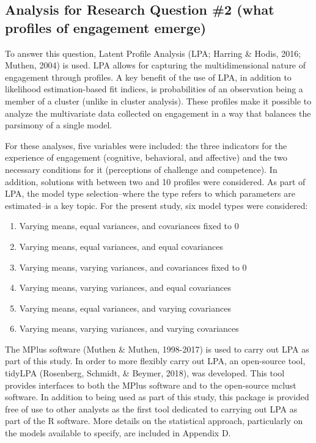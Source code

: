 \documentclass[]{book}
\providecommand{\tightlist}{%
  \setlength{\itemsep}{0pt}\setlength{\parskip}{0pt}}
\theoremstyle{definition}
\theoremstyle{definition}
\theoremstyle{definition}
\theoremstyle{remark}
\begin{document}
\subsection{Analysis for Research Question \#2 (what profiles of
engagement
emerge)}\label{analysis-for-research-question-2-what-profiles-of-engagement-emerge}

To answer this question, Latent Profile Analysis (LPA; Harring \& Hodis,
2016; Muthen, 2004) is used. LPA allows for capturing the
multidimensional nature of engagement through profiles. A key benefit of
the use of LPA, in addition to likelihood estimation-based fit indices,
is probabilities of an observation being a member of a cluster (unlike
in cluster analysis). These profiles make it possible to analyze the
multivariate data collected on engagement in a way that balances the
parsimony of a single model.

For these analyses, five variables were included: the three indicators
for the experience of engagement (cognitive, behavioral, and affective)
and the two necessary conditions for it (perceptions of challenge and
competence). In addition, solutions with between two and 10 profiles
were considered. As part of LPA, the model type selection--where the
type refers to which parameters are estimated--is a key topic. For the
present study, six model types were considered:

\begin{enumerate}
\def\labelenumi{\arabic{enumi}.}
\tightlist
\item
  Varying means, equal variances, and covariances fixed to 0
\item
  Varying means, equal variances, and equal covariances
\item
  Varying means, varying variances, and covariances fixed to 0
\item
  Varying means, varying variances, and equal covariances
\item
  Varying means, equal variances, and varying covariances
\item
  Varying means, varying variances, and varying covariances
\end{enumerate}

The MPlus software (Muthen \& Muthen, 1998-2017) is used to carry out
LPA as part of this study. In order to more flexibly carry out LPA, an
open-source tool, tidyLPA (Rosenberg, Schmidt, \& Beymer, 2018), was
developed. This tool provides interfaces to both the MPlus software and
to the open-source mclust software. In addition to being used as part of
this study, this package is provided free of use to other analysts as
the first tool dedicated to carrying out LPA as part of the R software.
More details on the statistical approach, particularly on the models
available to specify, are included in Appendix D.
\end{document}
